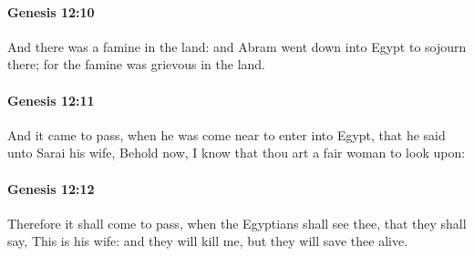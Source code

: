 		\paragraph{Genesis 12:10} %
			\label{GENESIS-12-10}

			And there was a famine in the land: and Abram went down into Egypt to sojourn there; for the famine was grievous in the land.


		\paragraph{Genesis 12:11} %
			\label{GENESIS-12-11}

			And it came to pass, when he was come near to enter into Egypt, that he said unto Sarai his wife, Behold now, I know that thou art a fair woman to look upon:


		\paragraph{Genesis 12:12} %
			\label{GENESIS-12-12}

			Therefore it shall come to pass, when the Egyptians shall see thee, that they shall say, This is his wife: and they will kill me, but they will save thee alive.


